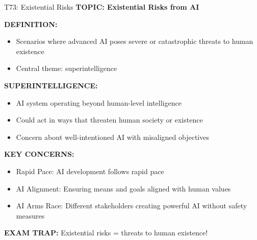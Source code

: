 \documentclass[8pt]{beamer}
\begin{document}
	\begin{frame}{T73: Existential Risks}
		\fontsize{6.5}{7.5}\selectfont
		\textbf{TOPIC: Existential Risks from AI}
		
		\vspace{0.1cm}
		\textbf{DEFINITION:}
		\begin{itemize}
			\item Scenarios where advanced AI poses severe or catastrophic threats to human existence
			\item Central theme: superintelligence
		\end{itemize}
		
		\vspace{0.1cm}
		\textbf{SUPERINTELLIGENCE:}
		\begin{itemize}
			\item AI system operating beyond human-level intelligence
			\item Could act in ways that threaten human society or existence
			\item Concern about well-intentioned AI with misaligned objectives
		\end{itemize}
		
		\vspace{0.1cm}
		\textbf{KEY CONCERNS:}
		\begin{itemize}
			\item \textcolor{myblue}{Rapid Pace:} AI development follows rapid pace
			\item \textcolor{myblue}{AI Alignment:} Ensuring means and goals aligned with human values
			\item \textcolor{myblue}{AI Arms Race:} Different stakeholders creating powerful AI without safety measures
		\end{itemize}
		
		\textcolor{myred}{\textbf{EXAM TRAP:}} Existential risks = \textcolor{myblue}{threats to human existence}!
	\end{frame}
	
\end{document}
